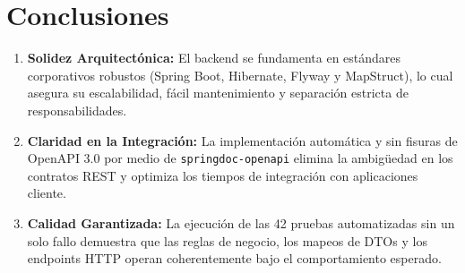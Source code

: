 \documentclass[12pt,a4paper]{article}
\begin{document}
\section{Conclusiones}
\begin{enumerate}
    \item \textbf{Solidez Arquitectónica:} El backend se fundamenta en estándares corporativos robustos (Spring Boot, Hibernate, Flyway y MapStruct), lo cual asegura su escalabilidad, fácil mantenimiento y separación estricta de responsabilidades.
    \item \textbf{Claridad en la Integración:} La implementación automática y sin fisuras de OpenAPI 3.0 por medio de \texttt{springdoc-openapi} elimina la ambigüedad en los contratos REST y optimiza los tiempos de integración con aplicaciones cliente.
    \item \textbf{Calidad Garantizada:} La ejecución de las 42 pruebas automatizadas sin un solo fallo demuestra que las reglas de negocio, los mapeos de DTOs y los endpoints HTTP operan coherentemente bajo el comportamiento esperado.
\end{enumerate}
\end{document}
